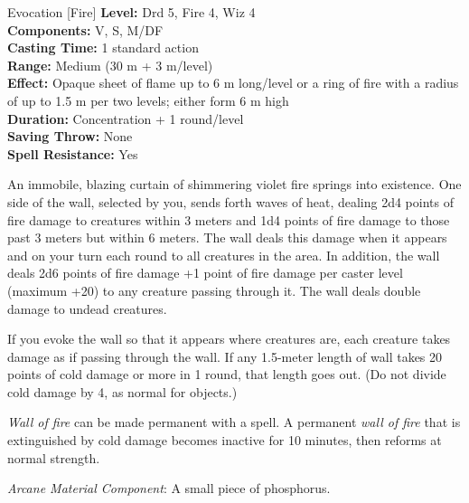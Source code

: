 {Evocation [Fire]}
{
	\textbf{Level:}
	Drd 5, Fire 4, Wiz 4\\
	\textbf{Components:}
	V, S, M/DF\\
	\textbf{Casting Time:}
	1 standard action\\
	\textbf{Range:}
	Medium (30 m + 3 m/level)\\
	\textbf{Effect:}
	Opaque sheet of flame up to 6 m long/level or a ring of fire with a radius of up to 1.5 m per two levels; either form 6 m high\\
	\textbf{Duration:}
	Concentration + 1 round/level\\
	\textbf{Saving Throw:}
	None\\
	\textbf{Spell Resistance:}
	Yes\\
}
{
	An immobile, blazing curtain of shimmering violet fire springs into existence. One side of the wall, selected by you, sends forth waves of heat, dealing 2d4 points of fire damage to creatures within 3 meters and 1d4 points of fire damage to those past 3 meters but within 6 meters. The wall deals this damage when it appears and on your turn each round to all creatures in the area. In addition, the wall deals 2d6 points of fire damage +1 point of fire damage per caster level (maximum +20) to any creature passing through it. The wall deals double damage to undead creatures.

	If you evoke the wall so that it appears where creatures are, each creature takes damage as if passing through the wall. If any 1.5-meter length of wall takes 20 points of cold damage or more in 1 round, that length goes out. (Do not divide cold damage by 4, as normal for objects.)

	\emph{Wall of fire} can be made permanent with a  spell. A permanent \emph{wall of fire} that is extinguished by cold damage becomes inactive for 10 minutes, then reforms at normal strength.

	\textit{Arcane Material Component}:
	A small piece of phosphorus.

}
